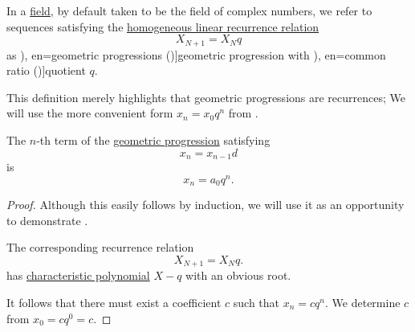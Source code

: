 \begin{definition}\label{def:geometric_progression}\mimprovised
  In a \hyperref[def:field]{field}, by default taken to be the field of complex numbers, we refer to sequences satisfying the \hyperref[def:homogeneous_linear_recurrence]{homogeneous linear recurrence relation}
  \begin{equation}\label{eq:def:geometric_progression/recurrence}
    X_{N+1} = X_N q
  \end{equation}
  as \term[ru=геометрическае прогрессии (\cite[144]{АлександровМаркушевичХинчинИПр1952ЭнциклопедияТом3}), en=geometric progressions (\cite[def. 2.4.2]{Rosen2019DiscreteMathematics})]{geometric progression} with \term[ru=знаменатель (прогрессии) (\cite[\S 227]{Киселёв2004Геометрия}), en=common ratio (\cite[def. 2.4.2]{Rosen2019DiscreteMathematics})]{quotient} \( q \).
\end{definition}
\begin{comments}
  \item This definition merely highlights that geometric progressions are recurrences; We will use the more convenient form \( x_n = x_0 q^n \) from .
\end{comments}

\begin{proposition}\label{thm:geometric_progression_unwinding}
  The \( n \)-th term of the \hyperref[def:arithmetic_progression]{geometric progression} satisfying
  \begin{equation*}
    x_n = x_{n-1} d
  \end{equation*}
  is
  \begin{equation*}
    x_n = a_0 q^n.
  \end{equation*}
\end{proposition}
\begin{proof}
  Although this easily follows by induction, we will use it as an opportunity to demonstrate .

  The corresponding recurrence relation
  \begin{equation*}
    X_{N+1} = X_N q.
  \end{equation*}
  has \hyperref[def:linear_recurrence_characteristic_polynomial]{characteristic polynomial} \( X - q \) with an obvious root.

  It follows that there must exist a coefficient \( c \) such that \( x_n = cq^n \). We determine \( c \) from \( x_0 = c q^0 = c \).
\end{proof}

